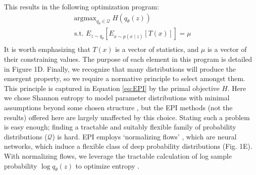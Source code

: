 \documentclass[11pt]{article}
\DeclareMathOperator*{\argmax}{argmax}
\begin{document}
This results in the following optimization program: 
 \begin{equation} \label{eq:EPI}
\begin{split}
&\argmax_{q_\theta \in \mathcal{Q}} H(q_\theta(z)) \\
 &\text{  s.t.  } E_{z \sim q_\theta}\left[ E_{x\sim p(x \mid z)}\left[T(x)\right] \right] = \mu \\
\end{split}
\end{equation}
It is worth emphasizing that $T(x)$ is a vector of statistics, and $\mu$ is a vector of their constraining values.
The purpose of each element in this program is detailed in Figure 1D.
Finally, we recognize that many distributions will produce the emergent property, so we require a normative principle to select amongst them.  
This principle is captured in Equation \ref{eq:EPI} by the primal objective $H$.  
Here we chose Shannon entropy to model parameter distributions with minimal assumptions beyond some chosen structure \cite{jaynes1957information, elsayed2017structure, loaiza2017maximum, savin2017maximum}, but the EPI methods (not the results) offered here are largely unaffected by this choice.  
Stating such a problem is easy enough; finding a tractable and suitably flexible family of probability distributions ($\mathcal{Q}$) is hard.  
EPI employs `normalizing flows' \cite{rezende2015variational, dinh2016density, papamakarios2017masked}, which are neural networks, which induce a flexible class of deep probability distributions (Fig. 1E).
With normalizing flows, we leverage the tractable calculation of log sample probability $\log q_\theta(z)$ to optimize entropy \cite{loaiza2017maximum}.
\end{document}
